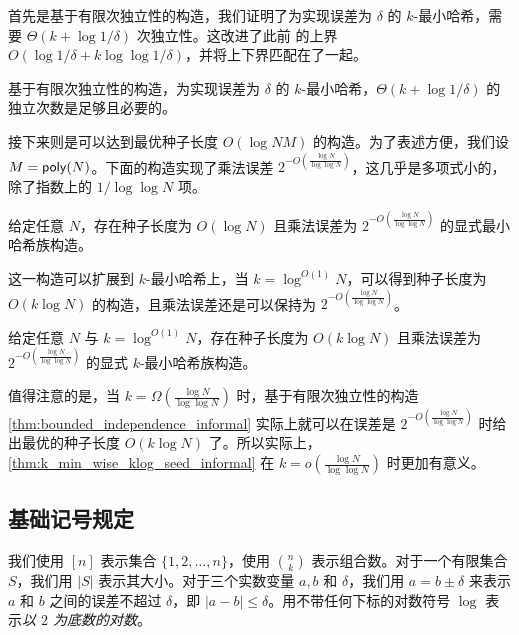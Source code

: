 首先是基于有限次独立性的构造，我们证明了为实现误差为 $\delta$ 的 $k$-最小哈希，需要 $\Theta(k + \log 1 / \delta)$ 次独立性。这改进了此前 \cite{minwise_FPS11} 的上界 $O(\log 1 / \delta + k \log \log 1 / \delta)$，并将上下界匹配在了一起。

\begin{theorem}\label{thm:bounded_independence_informal}
    基于有限次独立性的构造，为实现误差为 $\delta$ 的 $k$-最小哈希，$\Theta(k + \log 1 / \delta)$ 的独立次数是足够且必要的。
\end{theorem}

接下来则是可以达到最优种子长度 $O(\log N M)$ 的构造。为了表述方便，我们设 $M = \mathsf{poly}(N)$。下面的构造实现了乘法误差 $2^{-O\left( \frac{\log N}{\log \log N} \right)}$，这几乎是多项式小的，除了指数上的 $1 / \log \log N$ 项。

\begin{theorem}\label{thm:min_wise_log_seed_informal}
    给定任意 $N$，存在种子长度为 $O(\log N)$ 且乘法误差为 $2^{-O\left( \frac{\log N}{\log \log N} \right)}$ 的显式最小哈希族构造。
\end{theorem}

这一构造可以扩展到 $k$-最小哈希上，当 $k = \log^{O(1)} N$，可以得到种子长度为 $O(k \log N)$ 的构造，且乘法误差还是可以保持为 $2^{-O\left( \frac{\log N}{\log \log N} \right)}$。

\begin{theorem}\label{thm:k_min_wise_klog_seed_informal}
    给定任意 $N$ 与 $k = \log^{O(1)} N$，存在种子长度为 $O(k \log N)$ 且乘法误差为 $2^{-O\left( \frac{\log N}{\log \log N} \right)}$ 的显式 $k$-最小哈希族构造。
\end{theorem}

值得注意的是，当 $k = \Omega\left( \frac{\log N}{\log \log N} \right)$ 时，基于有限次独立性的构造 \cref{thm:bounded_independence_informal} 实际上就可以在误差是 $2^{-O\left( \frac{\log N}{\log \log N} \right)}$ 时给出最优的种子长度 $O(k \log N)$ 了。所以实际上，\cref{thm:k_min_wise_klog_seed_informal} 在 $k = o\left( \frac{\log N}{\log \log N} \right)$ 时更加有意义。

\subsection{基础记号规定}

我们使用 $[n]$ 表示集合 $\{1, 2, \ldots, n\}$，使用 ${n \choose k}$ 表示组合数。对于一个有限集合 $S$，我们用 $|S|$ 表示其大小。对于三个实数变量 $a, b$ 和 $\delta$，我们用 $a = b \pm \delta$ 来表示 $a$ 和 $b$ 之间的误差不超过 $\delta$，即 $|a - b| \le \delta$。用不带任何下标的对数符号 $\log$ 表示\emph{以 $2$ 为底数的对数}。

